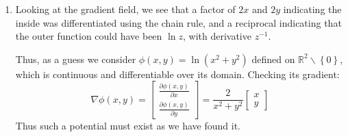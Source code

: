 \documentclass[a4paper, 11pt]{article}
\newcommand{\RR}{\mathbb{R}}
\def\set#1{\left\{ #1 \right\}}
\begin{document}
\begin{enumerate}[label=(\alph*)]

	\item

	      Looking at the gradient field,  we see that a factor of $2x$ and $2y$ indicating the inside was differentiated using the chain rule, and a reciprocal indicating that the outer function could have been $\ln z$, with derivative $z^{-1}$.

	      Thus, as a guess we consider $\phi(x,y)=\ln(x^2+y^2)$ defined on $\RR^2\backslash\set{0}$, which is continuous and differentiable over its domain. Checking its gradient:
	      \[
		      \nabla\phi(x,y)
		      =\begin{bmatrix}
			      \frac{\partial \phi(x,y)}{\partial x} \\
			      \frac{\partial \phi(x,y)}{\partial y}
		      \end{bmatrix}
		      =\frac 2{x^2+y^2}
		      \begin{bmatrix}
			      x \\y
		      \end{bmatrix}
	      \]
	      Thus such a potential must exist as we have found it.

\end{enumerate}
\end{document}
